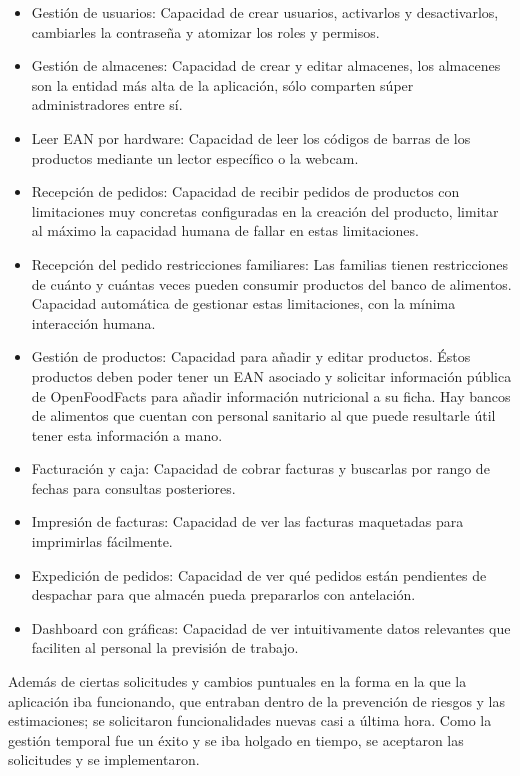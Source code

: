 \begin{itemize}
    \item Gestión de usuarios: Capacidad de crear usuarios, activarlos y desactivarlos, cambiarles la contraseña y atomizar los roles y permisos.
    \item Gestión de almacenes: Capacidad de crear y editar almacenes, los almacenes son la entidad más alta de la aplicación, sólo comparten súper administradores entre sí.
    \item Leer EAN por hardware: Capacidad de leer los códigos de barras de los productos mediante un lector específico o la webcam.
    \item Recepción de pedidos: Capacidad de recibir pedidos de productos con limitaciones muy concretas configuradas en la creación del producto, limitar al máximo la capacidad humana de fallar en estas limitaciones.
    \item Recepción del pedido restricciones familiares: Las familias tienen restricciones de cuánto y cuántas veces pueden consumir productos del banco de alimentos. Capacidad automática de gestionar estas limitaciones, con la mínima interacción humana.
    \item Gestión de productos: Capacidad para añadir y editar productos. Éstos productos deben poder tener un EAN asociado y solicitar información pública de OpenFoodFacts para añadir información nutricional a su ficha. Hay bancos de alimentos que cuentan con personal sanitario al que puede resultarle útil tener esta información a mano.
    \item Facturación y caja: Capacidad de cobrar facturas y buscarlas por rango de fechas para consultas posteriores.
    \item Impresión de facturas: Capacidad de ver las facturas maquetadas para imprimirlas fácilmente.
    \item Expedición de pedidos: Capacidad de ver qué pedidos están pendientes de despachar para que almacén pueda prepararlos con antelación.
    \item Dashboard con gráficas: Capacidad de ver intuitivamente datos relevantes que faciliten al personal la previsión de trabajo.
\end{itemize}
\vspace{1em}
\par Además de ciertas solicitudes y cambios puntuales en la forma en la que la aplicación iba funcionando, que entraban dentro de la prevención de riesgos y las estimaciones; se solicitaron funcionalidades nuevas casi a última hora. Como la gestión temporal fue un éxito y se iba holgado en tiempo, se aceptaron las solicitudes y se implementaron.
